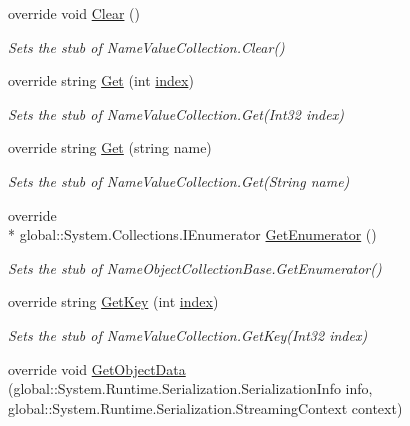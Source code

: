 \begin{DoxyCompactItemize}
override void \hyperlink{class_system_1_1_collections_1_1_specialized_1_1_fakes_1_1_stub_name_value_collection_a680611fe2902701d658295729afebbf1}{Clear} ()
\begin{DoxyCompactList}\small\item\em Sets the stub of Name\-Value\-Collection.\-Clear()\end{DoxyCompactList}\item 
override string \hyperlink{class_system_1_1_collections_1_1_specialized_1_1_fakes_1_1_stub_name_value_collection_af7bf6c5c4684332000ae51541523bc01}{Get} (int \hyperlink{jquery-1_810_82-vsdoc_8js_a75bb12d1f23302a9eea93a6d89d0193e}{index})
\begin{DoxyCompactList}\small\item\em Sets the stub of Name\-Value\-Collection.\-Get(\-Int32 index)\end{DoxyCompactList}\item 
override string \hyperlink{class_system_1_1_collections_1_1_specialized_1_1_fakes_1_1_stub_name_value_collection_a3a8c73fdfcc3fc3650ad6bdff9092500}{Get} (string name)
\begin{DoxyCompactList}\small\item\em Sets the stub of Name\-Value\-Collection.\-Get(\-String name)\end{DoxyCompactList}\item 
override \\*
global\-::\-System.\-Collections.\-I\-Enumerator \hyperlink{class_system_1_1_collections_1_1_specialized_1_1_fakes_1_1_stub_name_value_collection_ab74fea25fdcf67316ad153c697aa92de}{Get\-Enumerator} ()
\begin{DoxyCompactList}\small\item\em Sets the stub of Name\-Object\-Collection\-Base.\-Get\-Enumerator()\end{DoxyCompactList}\item 
override string \hyperlink{class_system_1_1_collections_1_1_specialized_1_1_fakes_1_1_stub_name_value_collection_a3b630af6416a7c7c8e7bcc84cff07265}{Get\-Key} (int \hyperlink{jquery-1_810_82-vsdoc_8js_a75bb12d1f23302a9eea93a6d89d0193e}{index})
\begin{DoxyCompactList}\small\item\em Sets the stub of Name\-Value\-Collection.\-Get\-Key(\-Int32 index)\end{DoxyCompactList}\item 
override void \hyperlink{class_system_1_1_collections_1_1_specialized_1_1_fakes_1_1_stub_name_value_collection_adef86e10ee3939555012066a969c050d}{Get\-Object\-Data} (global\-::\-System.\-Runtime.\-Serialization.\-Serialization\-Info info, global\-::\-System.\-Runtime.\-Serialization.\-Streaming\-Context context)

\end{DoxyCompactItemize}
